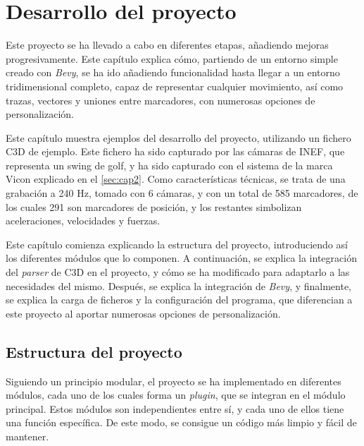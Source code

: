 


\chapter{Desarrollo del proyecto} \label{sec:cap3}

Este proyecto se ha llevado a cabo en diferentes etapas, añadiendo mejoras progresivamente. Este capítulo explica cómo, partiendo de un entorno simple creado con \textit{Bevy}, se ha ido añadiendo funcionalidad hasta llegar a un entorno tridimensional completo, capaz de representar cualquier movimiento, así como trazas, vectores y uniones entre marcadores, con numerosas opciones de personalización.

Este capítulo muestra ejemplos del desarrollo del proyecto, utilizando un fichero \ac{C3D} de ejemplo. Este fichero ha sido capturado por las cámaras de INEF, que representa un swing de golf, y ha sido capturado con el sistema de la marca Vicon explicado en el \autoref{sec:cap2}. Como características técnicas, se trata de una grabación a 240 \ac{Hz}, tomado con 6 cámaras, y con un total de 585 marcadores, de los cuales 291 son marcadores de posición, y los restantes simbolizan aceleraciones, velocidades y fuerzas.

Este capítulo comienza explicando la estructura del proyecto, introduciendo así los diferentes módulos que lo componen. A continuación, se explica la integración del \textit{parser} de \ac{C3D} en el proyecto, y cómo se ha modificado para adaptarlo a las necesidades del mismo. Después, se explica la integración de \textit{Bevy}, y finalmente, se explica la carga de ficheros y la configuración del programa, que diferencian a este proyecto al aportar numerosas opciones de personalización.


\section{Estructura del proyecto} \label{sec:estructura-programa}

Siguiendo un principio modular, el proyecto se ha implementado en diferentes módulos, cada uno de los cuales forma un \textit{plugin}, que se integran en el módulo principal. Estos módulos son independientes entre sí, y cada uno de ellos tiene una función específica. De este modo, se consigue un código más limpio y fácil de mantener.

